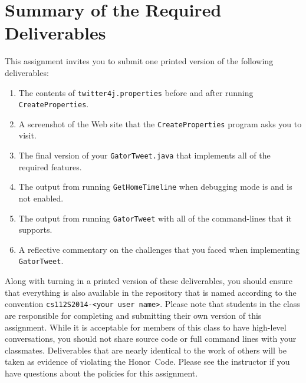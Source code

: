 \section*{Summary of the Required Deliverables}

  This assignment invites you to submit one printed version of the following deliverables: 

  \begin{enumerate}
    \item The contents of {\tt twitter4j.properties} before and after running {\tt CreateProperties}.
    \item A screenshot of the Web site that the {\tt CreateProperties} program asks you to visit.
    \item The final version of your {\tt GatorTweet.java} that implements all of the required features.
    \item The output from running {\tt GetHomeTimeline} when debugging mode is and is not enabled.
    \item The output from running {\tt GatorTweet} with all of the command-lines that it supports.
    \item A reflective commentary on the challenges that you faced when implementing {\tt GatorTweet}.
  \end{enumerate}

  Along with turning in a printed version of these deliverables, you should ensure that everything is also available in the
  repository that is named according to the convention {\tt cs112S2014-<your user name>}. Please note that students in the class
  are responsible for completing and submitting their own version of this assignment.    While it is acceptable for members of
  this class to have high-level conversations, you should not share source code or full command lines with your classmates.
  Deliverables that are nearly identical to the work of others will be taken as evidence of violating the \mbox{Honor Code}.
  Please see the instructor if you have questions about the policies for this assignment.

  
